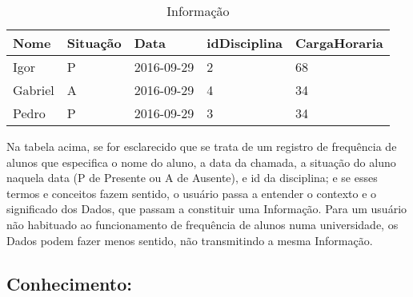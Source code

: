 \documentclass{article}
\begin{document}
\begin{table}[h]
\centering
\caption{Informação}
\label{info}
\begin{tabular}{|l|l|l|l|l|}
\hline
Nome    & Situação & Data       & idDisciplina & CargaHoraria \\ \hline
Igor    & P        & 2016-09-29 & 2            & 68           \\ \hline
Gabriel & A        & 2016-09-29 & 4            & 34           \\ \hline
Pedro   & P        & 2016-09-29 & 3            & 34           \\ \hline
\end{tabular}
\end{table}
\noindent
Na tabela acima, se for esclarecido que se trata de um registro de frequência de alunos que especifica o nome do aluno, a data da chamada, a situação do aluno naquela data (P de Presente ou A de Ausente), e id da disciplina; e se esses termos e conceitos fazem sentido, o usuário passa a entender o contexto e o significado dos Dados, que passam a constituir uma Informação. Para um usuário não habituado ao funcionamento de frequência de alunos numa universidade, os Dados podem fazer menos sentido, não transmitindo a mesma Informação.

\subsection{Conhecimento:}
\end{document}

